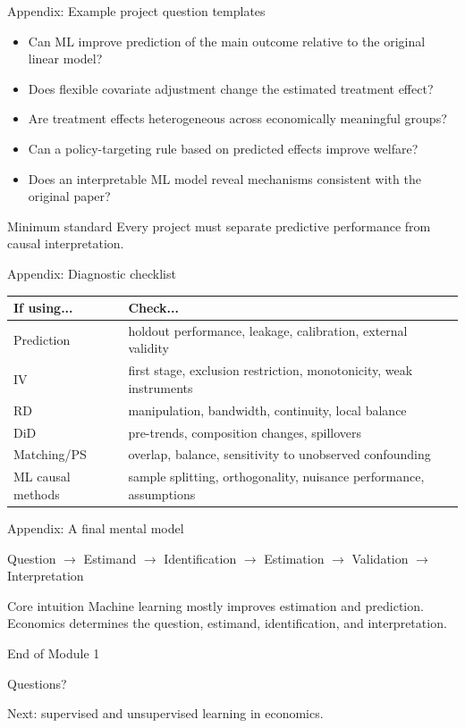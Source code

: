 \documentclass[aspectratio=169,11pt]{beamer}
\newcommand{\core}[1]{\begin{block}{Core intuition}#1\end{block}}
\begin{document}
\begin{frame}{Appendix: Example project question templates}
\begin{itemize}
  \item Can ML improve prediction of the main outcome relative to the original linear model?
  \item Does flexible covariate adjustment change the estimated treatment effect?
  \item Are treatment effects heterogeneous across economically meaningful groups?
  \item Can a policy-targeting rule based on predicted effects improve welfare?
  \item Does an interpretable ML model reveal mechanisms consistent with the original paper?
\end{itemize}
\begin{alertblock}{Minimum standard}
Every project must separate predictive performance from causal interpretation.
\end{alertblock}
\end{frame}

\begin{frame}{Appendix: Diagnostic checklist}
\begin{center}
\begin{tabular}{p{}p{}}
\toprule
If using... & Check... \\
\midrule
Prediction & holdout performance, leakage, calibration, external validity \\
IV & first stage, exclusion restriction, monotonicity, weak instruments \\
RD & manipulation, bandwidth, continuity, local balance \\
DiD & pre-trends, composition changes, spillovers \\
Matching/PS & overlap, balance, sensitivity to unobserved confounding \\
ML causal methods & sample splitting, orthogonality, nuisance performance, assumptions \\
\bottomrule
\end{tabular}
\end{center}
\end{frame}

\begin{frame}{Appendix: A final mental model}
\begin{center}
\Large
Question $\rightarrow$ Estimand $\rightarrow$ Identification $\rightarrow$ Estimation $\rightarrow$ Validation $\rightarrow$ Interpretation
\end{center}
\vspace{1em}
\core{
Machine learning mostly improves estimation and prediction. Economics determines the question, estimand, identification, and interpretation.
}
\end{frame}

\begin{frame}{End of Module 1}
\begin{center}
\Huge Questions?
\end{center}
\vspace{1em}
\begin{center}
\large Next: supervised and unsupervised learning in economics.
\end{center}
\end{frame}
\end{document}
